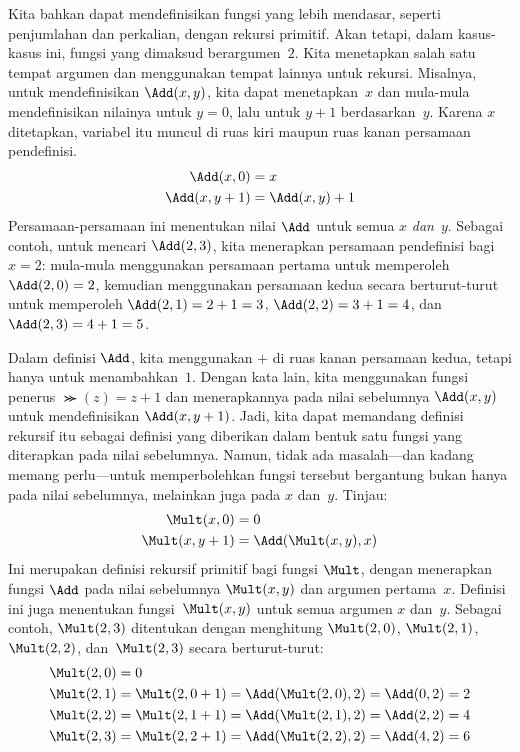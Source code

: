 \documentclass[../../../include/open-logic-section]{subfiles}
\begin{document}
Kita bahkan dapat mendefinisikan fungsi yang lebih mendasar, seperti
penjumlahan dan perkalian, dengan rekursi primitif. Akan tetapi, dalam
kasus-kasus ini, fungsi yang dimaksud berargumen~$2$. Kita menetapkan salah satu
tempat argumen dan menggunakan tempat lainnya untuk rekursi. Misalnya, untuk
mendefinisikan $\Add(x, y)$, kita dapat menetapkan~$x$ dan mula-mula
mendefinisikan nilainya untuk $y=0$, lalu untuk $y+1$ berdasarkan~$y$. Karena
$x$ ditetapkan, variabel itu muncul di ruas kiri maupun ruas kanan persamaan
pendefinisi.
\begin{align*}
\Add(x,0) & =  x\\
\Add(x,y+1) & =  \Add(x,y)+1
\end{align*}
Persamaan-persamaan ini menentukan nilai $\Add$ untuk semua $x$
\emph{dan}~$y$. Sebagai contoh, untuk mencari $\Add(2,3)$, kita menerapkan
persamaan pendefinisi bagi $x = 2$: mula-mula menggunakan persamaan pertama
untuk memperoleh $\Add(2,0) = 2$, kemudian menggunakan persamaan kedua secara
berturut-turut untuk memperoleh $\Add(2,1) = 2 + 1 = 3$, $\Add(2, 2) = 3 + 1
= 4$, dan $\Add(2, 3) = 4 + 1 = 5$.

Dalam definisi $\Add$, kita menggunakan $+$ di ruas kanan persamaan kedua,
tetapi hanya untuk menambahkan~$1$. Dengan kata lain, kita menggunakan fungsi
penerus $\Succ(z) = z+1$ dan menerapkannya pada nilai sebelumnya
$\Add(x,y)$ untuk mendefinisikan $\Add(x,y+1)$. Jadi, kita dapat memandang
definisi rekursif itu sebagai definisi yang diberikan dalam bentuk satu fungsi
yang diterapkan pada nilai sebelumnya. Namun, tidak ada masalah---dan kadang
memang perlu---untuk memperbolehkan fungsi tersebut bergantung bukan hanya pada
nilai sebelumnya, melainkan juga pada $x$ dan~$y$. Tinjau:
\begin{align*}
  \Mult(x,0) & =  0 \\
  \Mult(x,y+1) & =  \Add(\Mult(x,y),x)
\end{align*}
Ini merupakan definisi rekursif primitif bagi fungsi $\Mult$, dengan
menerapkan fungsi $\Add$ pada nilai sebelumnya $\Mult(x,y)$ dan argumen
pertama~$x$. Definisi ini juga menentukan fungsi~$\Mult(x,y)$ untuk semua
argumen $x$ dan~$y$. Sebagai contoh, $\Mult(2,3)$ ditentukan dengan menghitung
$\Mult(2,0)$, $\Mult(2,1)$, $\Mult(2,2)$, dan~$\Mult(2,3)$ secara
berturut-turut:
\begin{align*}
  \Mult(2,0) & = 0\\
  \Mult(2,1) & = \Mult(2,0+1) =
  \Add(\Mult(2,0), 2) = \Add(0, 2) = 2\\
  \Mult(2,2) & = \Mult(2,1+1) =
  \Add(\Mult(2,1), 2) = \Add(2, 2) = 4\\
  \Mult(2,3) & = \Mult(2,2+1) =
  \Add(\Mult(2,2), 2) = \Add(4, 2) = 6
\end{align*}
\end{document}
